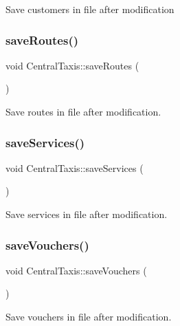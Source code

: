 Save customers in file after modification \hypertarget{classCentralTaxis_a82f1612dc9c403c5fdb9997230b6d256}{}\label{classCentralTaxis_a82f1612dc9c403c5fdb9997230b6d256} 
\subsubsection{\texorpdfstring{save\+Routes()}{saveRoutes()}}
{\footnotesize\ttfamily void Central\+Taxis\+::save\+Routes (\begin{DoxyParamCaption}{ }\end{DoxyParamCaption})}

Save routes in file after modification. \hypertarget{classCentralTaxis_a9edea0d7bf78ea4dfbba91c89d4d75f2}{}\label{classCentralTaxis_a9edea0d7bf78ea4dfbba91c89d4d75f2} 
\subsubsection{\texorpdfstring{save\+Services()}{saveServices()}}
{\footnotesize\ttfamily void Central\+Taxis\+::save\+Services (\begin{DoxyParamCaption}{ }\end{DoxyParamCaption})}

Save services in file after modification. \hypertarget{classCentralTaxis_a9376fbd8fe4cb00eadb8362318d722e0}{}\label{classCentralTaxis_a9376fbd8fe4cb00eadb8362318d722e0} 
\subsubsection{\texorpdfstring{save\+Vouchers()}{saveVouchers()}}
{\footnotesize\ttfamily void Central\+Taxis\+::save\+Vouchers (\begin{DoxyParamCaption}{ }\end{DoxyParamCaption})}

Save vouchers in file after modification. \hypertarget{classCentralTaxis_a129e85f40c8b2c618b5ea3b72551dd2c}{}\label{classCentralTaxis_a129e85f40c8b2c618b5ea3b72551dd2c} 
